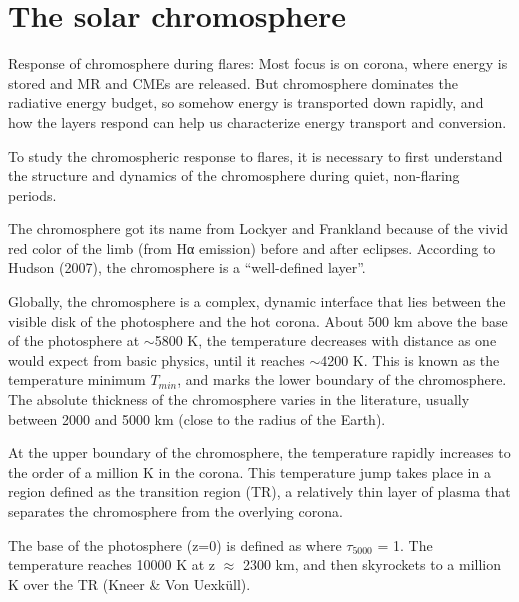 \section{The solar chromosphere}




Response of chromosphere during flares:
Most focus is on corona, where energy
is stored and MR and CMEs are released.
But chromosphere dominates the
radiative energy budget, so somehow energy is transported down rapidly, and how
the layers respond can help us characterize energy transport and
conversion.%
%




To study the chromospheric response to flares, it is necessary
to first understand the structure and dynamics of the chromosphere
during quiet, non-flaring periods.

The chromosphere got its name from Lockyer and Frankland because of the vivid
red color of the limb (from Hα emission) before and after eclipses.
According to Hudson (2007), the chromosphere is a ``well-defined layer''.

Globally, the chromosphere is a complex, dynamic interface that lies between
the visible disk of the photosphere and the hot corona.
About 500 km above the base of the photosphere at $\sim$5800 K, the temperature
decreases with distance as one would expect from basic physics,
until it reaches $\sim$4200 K.
This is known as the temperature minimum $T_{min}$, and
marks the lower boundary of the chromosphere.
The absolute
thickness of the chromosphere varies in the literature, usually between 2000
and 5000 km (close to the radius of the Earth).

At the upper boundary of the chromosphere, the temperature rapidly increases to
the order of a million K in the corona.
This temperature jump takes place in a region defined as the transition
region (TR), a relatively thin layer of plasma that separates the chromosphere
from the overlying corona.

The base of the photosphere (z=0) is defined as where
$\tau_{5000}$ = 1.
The temperature reaches 10000 K at z $\approx$ 2300 km, and then skyrockets
to a million K over the TR (Kneer \& Von Uexküll).


